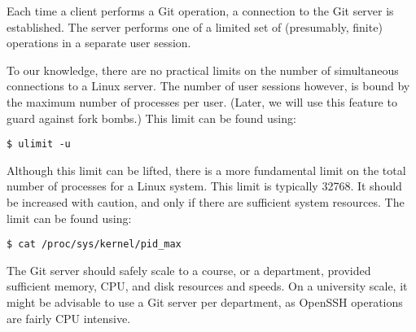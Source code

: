 Each time a client performs a Git operation, a connection to the Git server is
established. The server performs one of a limited set of (presumably, finite)
operations in a separate user session.

To our knowledge, there are no practical limits on the number of simultaneous
connections to a Linux server. The number of user sessions however, is bound by
the maximum number of processes per user. (Later, we will use this feature to
guard against fork bombs.) This limit can be found using:

\begin{lstlisting}
$ ulimit -u
\end{lstlisting}

Although this limit can be lifted, there is a more fundamental limit on the
total number of processes for a Linux system. This limit is typically 32768. It
should be increased with caution, and only if there are sufficient system
resources. The limit can be found using:

\begin{lstlisting}
$ cat /proc/sys/kernel/pid_max
\end{lstlisting}

The Git server should safely scale to a course, or a department, provided
sufficient memory, CPU, and disk resources and speeds. On a university scale,
it might be advisable to use a Git server per department, as OpenSSH operations
are fairly CPU intensive.
